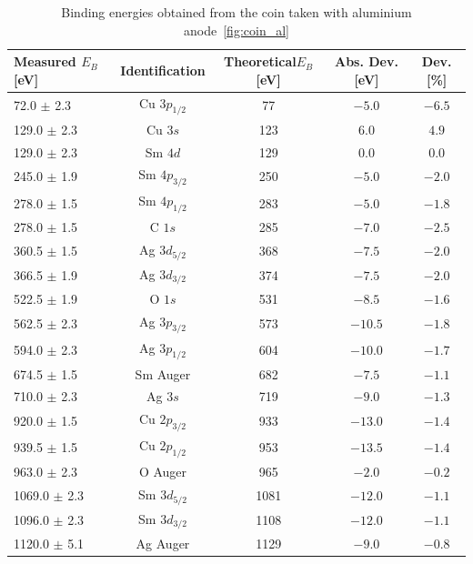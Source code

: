 \documentclass[a4paper,10pt]{scrartcl}
\begin{document}
\begin{table}
\begin{center}
\begin{tabular}{lcccc}
\toprule
Measured $E_{B}$ [eV]      & Identification & Theoretical$E_{B}$ [eV] & Abs. Dev. [eV] & Dev. [\%]\\
\midrule
\phantom{00}72.0 $\pm$ 2.3 & Cu $3p_{1/2}$  & 77                      & $-5.0$         & $-6.5$   \\
\phantom{0}129.0 $\pm$ 2.3 & Cu $3s$        & 123                     & $6.0$          & $4.9$    \\
\phantom{0}129.0 $\pm$ 2.3 & Sm $4d$        & 129                     & $0.0$          & $0.0$    \\
\phantom{0}245.0 $\pm$ 1.9 & Sm $4p_{3/2}$  & 250                     & $-5.0$         & $-2.0$   \\
\phantom{0}278.0 $\pm$ 1.5 & Sm $4p_{1/2}$  & 283                     & $-5.0$         & $-1.8$   \\
\phantom{0}278.0 $\pm$ 1.5 & C $1s$         & 285                     & $-7.0$         & $-2.5$   \\
\phantom{0}360.5 $\pm$ 1.5 & Ag $3d_{5/2}$  & 368                     & $-7.5$         & $-2.0$   \\
\phantom{0}366.5 $\pm$ 1.9 & Ag $3d_{3/2}$  & 374                     & $-7.5$         & $-2.0$   \\
\phantom{0}522.5 $\pm$ 1.9 & O $1s$         & 531                     & $-8.5$         & $-1.6$   \\
\phantom{0}562.5 $\pm$ 2.3 & Ag $3p_{3/2}$  & 573                     & $-10.5$        & $-1.8$   \\
\phantom{0}594.0 $\pm$ 2.3 & Ag $3p_{1/2}$  & 604                     & $-10.0$        & $-1.7$   \\
\phantom{0}674.5 $\pm$ 1.5 & Sm Auger       & 682                     & $-7.5$         & $-1.1$   \\
\phantom{0}710.0 $\pm$ 2.3 & Ag $3s$        & 719                     & $-9.0$         & $-1.3$   \\
\phantom{0}920.0 $\pm$ 1.5 & Cu $2p_{3/2}$  & 933                     & $-13.0$        & $-1.4$   \\
\phantom{0}939.5 $\pm$ 1.5 & Cu $2p_{1/2}$  & 953                     & $-13.5$        & $-1.4$   \\
\phantom{0}963.0 $\pm$ 2.3 & O Auger        & 965                     & $-2.0$         & $-0.2$   \\
1069.0 $\pm$ 2.3           & Sm $3d_{5/2}$  & 1081                    & $-12.0$        & $-1.1$   \\
1096.0 $\pm$ 2.3           & Sm $3d_{3/2}$  & 1108                    & $-12.0$        & $-1.1$   \\
1120.0 $\pm$ 5.1           & Ag Auger       & 1129                    & $-9.0$         & $-0.8$   \\
\bottomrule
\end{tabular}
\end{center}
\par
\caption{Binding energies obtained from the coin taken with aluminium anode~\ref{fig:coin_al} \label{tab:coin_al_ident}}
\end{table}
\end{document}
